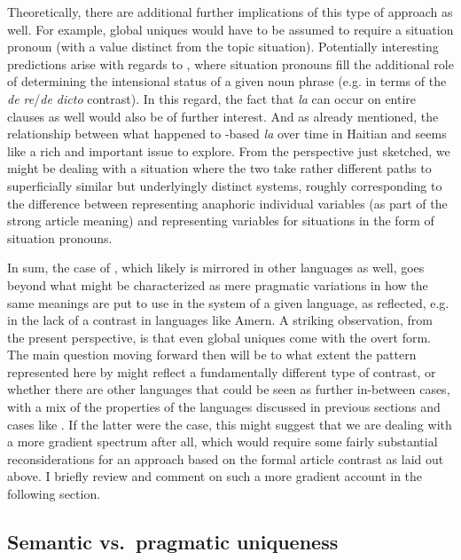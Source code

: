 \documentclass[output=paper
,modfonts
,nonflat]{langscibook}
\begin{document}
Theoretically, there are additional further implications of this type
of approach as well. For example, global uniques would have to be
assumed to require a situation pronoun (with a value distinct from the
topic situation). Potentially interesting predictions arise with
regards to , where situation pronouns fill the
additional role of determining the intensional status of a
given noun phrase (e.g. in terms of the \textit{de re}\slash\textit{de dicto}
contrast). In this regard, the fact that \textit{la} can occur on
entire clauses as well would also be of further interest. And as
already mentioned, the relationship between what happened to
-based \textit{la} over time in Haitian and 
seems like a rich and important issue to explore. From the perspective
just sketched, we might be dealing with a situation where the two take
rather different paths to superficially similar but underlyingly
distinct systems, roughly corresponding to the difference between
representing anaphoric individual variables (as part of the strong
article meaning) and representing variables for situations in the form
of situation pronouns.

In sum, the case of , which likely is mirrored in other
languages as well, goes beyond what might be characterized as mere
pragmatic variations in how the same meanings are put to use in the
system of a given language, as reflected, e.g. in the lack of a
 contrast in languages like Amern. A striking observation, from the
present perspective, is that even global uniques come with the overt
form. The main question moving forward then will be to what extent the
pattern represented here by  might reflect a
fundamentally different type of contrast, or whether there are other
languages that could be seen as further in-between cases, with a mix of
the properties of the languages discussed in previous sections and
cases like . If the latter were the case, this might
suggest that we are dealing with a more gradient spectrum after all,
which would require some fairly substantial reconsiderations for an
approach based on the formal article contrast as laid out above. I
briefly review and comment on such a more gradient account in the
following section.

\subsection{Semantic vs.\ pragmatic uniqueness}
\end{document}
